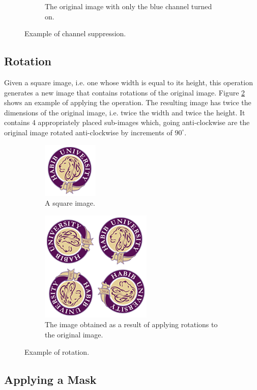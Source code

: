 \documentclass[addpoints]{exam}
\begin{document}
\begin{figure}
\begin{subfigure}{.3\textwidth}
    \caption{The original image with only the blue channel turned on.}
  \end{subfigure}
  \caption{Example of channel suppression.}
  \label{fig:channel}
\end{figure}

\subsection{Rotation}

Given a square image, i.e. one whose width is equal to its height, this operation generates a new image that contains rotations of the original image. Figure \ref{fig:rotate} shows an example of applying the operation. The resulting image has twice the dimensions of the original image, i.e. twice the width and twice the height. It contains 4 appropriately placed sub-images which, going anti-clockwise are the original image rotated anti-clockwise by increments of  $90^\circ$.

\begin{figure}
  \centering
  \begin{subfigure}{.2\textwidth}
    \includegraphics[scale=.5]{hu-logo}
    \caption{A square image.}
  \end{subfigure}
  \begin{subfigure}[c]{.35\textwidth}
    \includegraphics[scale=.5]{hu-logo-rotated}
    \caption{The image obtained as a result of applying rotations to the original image.}
  \end{subfigure}
  \caption{Example of rotation.}
  \label{fig:rotate}
\end{figure}

\subsection{Applying a Mask}
\end{document}
